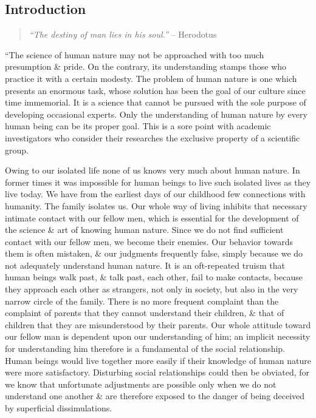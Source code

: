 \documentclass{article}
\begin{document}
\subsection{Introduction}

\begin{quote}
	{\it``The destiny of man lies in his soul.''} -- {\sc Herodotus}
\end{quote}
``The science of human nature may not be approached with too much presumption \& pride. On the contrary, its understanding stamps those who practice it with a certain modesty. The problem of human nature is one which presents an enormous task, whose solution has been the goal of our culture since time immemorial. It is a science that cannot be pursued with the sole purpose of developing occasional experts. Only the understanding of human nature by every human being can be its proper goal. This is a sore point with academic investigators who consider their researches the exclusive property of a scientific group.

Owing to our isolated life none of us knows very much about human nature. In former times it was impossible for human beings to live such isolated lives as they live today. We have from the earliest days of our childhood few connections with humanity. The family isolates us. Our whole way of living inhibits that necessary intimate contact with our fellow men, which is essential for the development of the science \& art of knowing human nature. Since we do not find sufficient contact with our fellow men, we become their enemies. Our behavior towards them is often mistaken, \& our judgments frequently false, simply because we do not adequately understand human nature. It is an oft-repeated truism that human beings walk past, \& talk past, each other, fail to make contacts, because they approach each other as strangers, not only in society, but also in the very narrow circle of the family. There is no more frequent complaint than the complaint of parents that they cannot understand their children, \& that of children that they are misunderstood by their parents. Our whole attitude toward our fellow man is dependent upon our understanding of him; an implicit necessity for understanding him therefore is a fundamental of the social relationship. Human beings would live together more easily if their knowledge of human nature were more satisfactory. Disturbing social relationships could then be obviated, for we know that unfortunate adjustments are possible only when we do not understand one another \& are therefore exposed to the danger of being deceived by superficial dissimulations.
\end{document}

